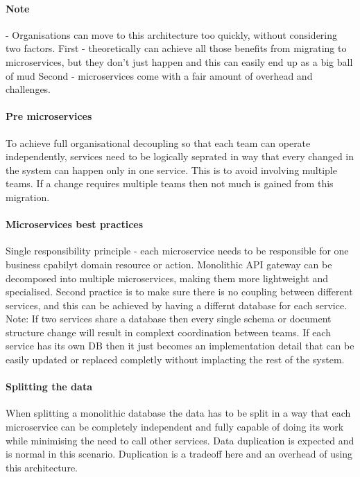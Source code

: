 \documentclass[a4paper, 11pt]{book}
\begin{document}
    \paragraph{Note} - Organisations can move to this architecture too quickly, without considering two factors.
    First - theoretically can achieve all those benefits from migrating to microservices, but they don't just happen and this can easily end up as a big ball of mud
    Second - microservices come with a fair amount of overhead and challenges.

    \paragraph{Pre microservices}
    To achieve full organisational decoupling so that each team can operate independently, services need to be logically seprated in way that every changed in the system can happen only in one service.
    This is to avoid involving multiple teams.
    If a change requires multiple teams then not much is gained from this migration.

    \paragraph{Microservices best practices}
    Single responsibility principle - each microservice needs to be responsible for one business cpabilyt domain resource or action.
    Monolithic API gateway can be decomposed into multiple microservices, making them more lightweight and specialised.
    Second practice is to make sure there is no coupling between different services, and this can be achieved by having a differnt database for each service.
    Note: If two services share a database then every single schema or document structure change will result in complext coordination between teams.
    If each service has its own DB then it just becomes an implementation detail that can be easily updated or replaced completly without implacting the rest of the system.

    \paragraph{Splitting the data}
    When splitting a monolithic database the data has to be split in a way that each microservice can be completely independent and fully capable of doing its work while minimising the need to call other services.
    Data duplication is expected and is normal in this scenario.
    Duplication is a tradeoff here and an overhead of using this architecture.
\end{document}
